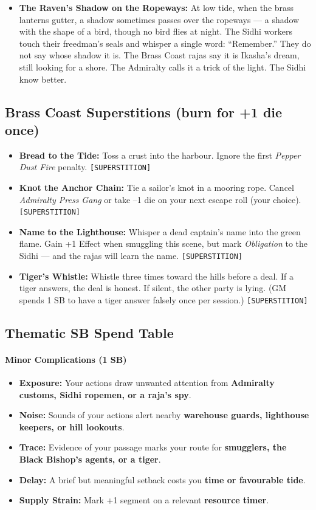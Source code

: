 \begin{itemize}
  \item \textbf{The Raven's Shadow on the Ropeways:} At low tide, when the brass lanterns gutter, a shadow sometimes passes over the ropeways --- a shadow with the shape of a bird, though no bird flies at night. The Sidhi workers touch their freedman's seals and whisper a single word: ``Remember.'' They do not say whose shadow it is. The Brass Coast rajas say it is Ikasha's dream, still looking for a shore. The Admiralty calls it a trick of the light. The Sidhi know better.
\end{itemize}

\subsection*{Brass Coast Superstitions (burn for +1 die once)}
\begin{itemize}
  \item \textbf{Bread to the Tide:} Toss a crust into the harbour. Ignore the first \emph{Pepper Dust Fire} penalty. \texttt{[SUPERSTITION]}
  \item \textbf{Knot the Anchor Chain:} Tie a sailor's knot in a mooring rope. Cancel \emph{Admiralty Press Gang} or take --1 die on your next escape roll (your choice). \texttt{[SUPERSTITION]}
  \item \textbf{Name to the Lighthouse:} Whisper a dead captain's name into the green flame. Gain +1 Effect when smuggling this scene, but mark \emph{Obligation} to the Sidhi --- and the rajas will learn the name. \texttt{[SUPERSTITION]}
  \item \textbf{Tiger's Whistle:} Whistle three times toward the hills before a deal. If a tiger answers, the deal is honest. If silent, the other party is lying. (GM spends 1 SB to have a tiger answer falsely once per session.) \texttt{[SUPERSTITION]}
\end{itemize}

\subsection*{Thematic SB Spend Table}
\label{sec:brasscoast-sb}

\paragraph{Minor Complications (1 SB)}
\begin{itemize}
\item \textbf{Exposure:} Your actions draw unwanted attention from \textbf{Admiralty customs, Sidhi ropemen, or a raja's spy}.
\item \textbf{Noise:} Sounds of your actions alert nearby \textbf{warehouse guards, lighthouse keepers, or hill lookouts}.
\item \textbf{Trace:} Evidence of your passage marks your route for \textbf{smugglers, the Black Bishop's agents, or a tiger}.
\item \textbf{Delay:} A brief but meaningful setback costs you \textbf{time or favourable tide}.
\item \textbf{Supply Strain:} Mark +1 segment on a relevant \textbf{resource timer}.
\end{itemize}

